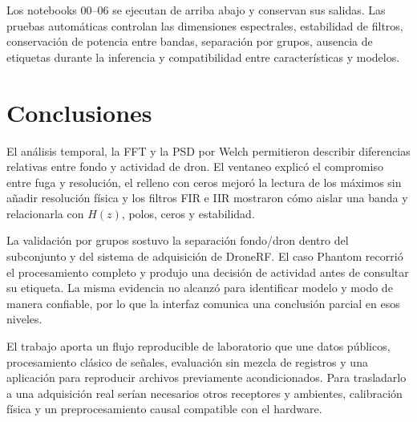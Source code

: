 \documentclass[11pt,a4paper]{article}
\begin{document}
Los notebooks 00--06 se ejecutan de arriba abajo y conservan sus salidas. Las pruebas
automáticas controlan las dimensiones espectrales, estabilidad de filtros, conservación de
potencia entre bandas, separación por grupos, ausencia de etiquetas durante la inferencia y
compatibilidad entre características y modelos.

\section{Conclusiones}

El análisis temporal, la FFT y la PSD por Welch permitieron describir diferencias relativas
entre fondo y actividad de dron. El ventaneo explicó el compromiso entre fuga y resolución,
el relleno con ceros mejoró la lectura de los máximos sin añadir resolución física y los
filtros FIR e IIR mostraron cómo aislar una banda y relacionarla con $H(z)$, polos, ceros y
estabilidad.

La validación por grupos sostuvo la separación fondo/dron dentro del subconjunto y del
sistema de adquisición de DroneRF. El caso Phantom recorrió el procesamiento completo y
produjo una decisión de actividad antes de consultar su etiqueta. La misma evidencia no
alcanzó para identificar modelo y modo de manera confiable, por lo que la interfaz comunica
una conclusión parcial en esos niveles.

El trabajo aporta un flujo reproducible de laboratorio que une datos públicos,
procesamiento clásico de señales, evaluación sin mezcla de registros y una aplicación para
reproducir archivos previamente acondicionados. Para trasladarlo a una adquisición real
serían necesarios otros receptores y ambientes, calibración física y un preprocesamiento
causal compatible con el hardware.
\end{document}
